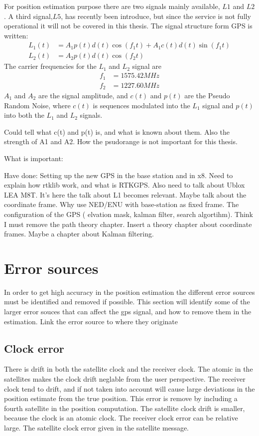 For position estimation purpose there are two signals mainly available, $L1$ and $L2$. A third signal,$L5$, has recently been introduce, but since the service is not fully operational it will not be covered in this thesis. The signal structure form GPS is written:
\begin{align*}
L_1(t) &= A_1p(t)d(t)\cos(f_1t) + A_1c(t)d(t)\sin(f_1t) \\
L_2(t) &= A_2p(t)d(t)\cos(f_2t)
\end{align*}
The carrier frequencies for the $L_1$ and $ L_2$ signal are
\begin{align*}
f_1 &= 1575.42 MHz \\
f_2 &= 1227.60 MHz
\end{align*}
$A_1$ and $A_2$ are the signal amplitude, and $c(t)$ and $p(t)$ are the Pseudo Random Noise, where $c(t)$ is sequences modulated into the $L_1$ signal and $p(t)$ into both the $L_1$ and $L_2$ signals.

Could tell what c(t) and p(t) is, and what is known about them. Also the strength of A1 and A2. How the psudorange is not important for this thesis.

What is important:

Have done: Setting up the new GPS in the base station and in x8. Need to explain how rtklib work, and what is RTKGPS. Also need to talk about Ublox LEA M8T. It's here the talk about L1 becomes relevant. Maybe talk about the coordinate frame. Why use NED/ENU with base-station as fixed frame. The configuration of the GPS ( elvation mask, kalman filter, search algortihm). Think I must remove the path theory chapter. Insert a theory chapter about coordinate frames. Maybe a chapter about Kalman filtering.
 
\section{Error sources}
In order to get high accuracy in the position estimation the different error sources must be identified and removed if possible. This section will identify some of the larger error souces that can affect the gps signal, and how to remove them in the estimation.
Link the error source to where they originate
\subsection{Clock error}
There is drift in both the satellite clock and the receiver clock. The atomic in the satellites makes the clock drift neglable from the user perspective. The receiver clock tend to drift, and if not taken into account will cause large deviations in the position estimate from the true position. This error is remove by including a fourth satellite in the position computation.  The satellite clock drift is smaller, because the clock is an atomic clock. The receiver clock error can be relative large. The satellite clock error given in the satellite message. 

